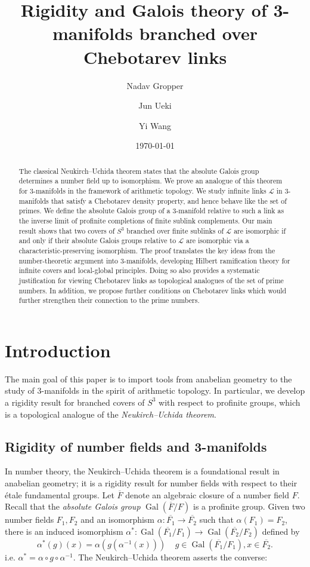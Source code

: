 \documentclass{amsart}
\title{Rigidity and Galois theory of 3-manifolds branched over Chebotarev links}
\author{Nadav Gropper}
\author{Jun Ueki}
\author{Yi Wang}
\date{\today}
\theoremstyle{plain}
\theoremstyle{definition}
\theoremstyle{plain}
\theoremstyle{plain}
\theoremstyle{plain}
\theoremstyle{remark}
\theoremstyle{remark}
\theoremstyle{plain}
\theoremstyle{definition}
\theoremstyle{plain}
\DeclareMathOperator{\Gal}{\mathrm{Gal}}
\newcounter{main}
\theoremstyle{plain}
\theoremstyle{plain}
\numberwithin{equation}{section}
\begin{document}
\begin{abstract}
The classical Neukirch--Uchida theorem states that the absolute Galois group determines a number field up to isomorphism. We prove an analogue of this theorem for 3-manifolds in the framework of arithmetic topology. We study infinite links $\mathcal{L}$ in 3-manifolds that satisfy a Chebotarev density property, and hence behave like the set of primes. We define the absolute Galois group of a 3-manifold relative to such a link as the inverse limit of profinite completions of finite sublink complements. Our main result shows that two covers of $S^3$ branched over finite sublinks of $\mathcal{L}$ are isomorphic if and only if their absolute Galois groups relative to $\mathcal{L}$ are isomorphic via a characteristic-preserving isomorphism. The proof translates the key ideas from the number-theoretic argument into 3-manifolds, developing Hilbert ramification theory for infinite covers and local-global principles. Doing so also provides a systematic justification for viewing Chebotarev links as topological analogues of the set of prime numbers. In addition, we propose further conditions on Chebotarev links which would further strengthen their connection to the prime numbers. 
\end{abstract} 

\maketitle

\tableofcontents
\newpage
\section{Introduction}

The main goal of this paper is to import tools from anabelian geometry to the study of 3-manifolds in the spirit of arithmetic topology. In particular, we develop  a rigidity result for branched covers of $S^3$ with respect to profinite groups, which is a topological analogue of the \emph{Neukirch--Uchida theorem}.  

\subsection{Rigidity of number fields and 3-manifolds}

In number theory, the Neukirch--Uchida theorem is a foundational result in anabelian geometry; it is a rigidity result for number fields with respect to their \'etale fundamental groups. Let $\overline{F}$ denote an algebraic closure of a number field $F$. 
Recall that the \emph{absolute Galois group} $\Gal(\overline{F}/F)$ is a profinite group. Given two number fields $F_1, F_2$ and an isomorphism $\alpha: \overline{F_1} \to \overline{F_2}$ such that $\alpha(F_1) = F_2$, there is an induced isomorphism $\alpha^\ast:\Gal(\overline{F_1}/F_1) \to \Gal(\overline{F_2}/F_2)$ defined by
\begin{equation}\label{eq:induced}
    \alpha^*(g)(x) = \alpha(g(\alpha^{-1}(x))) \ \ \ \ \ g \in \Gal(\overline{F_1}/F_1), x \in \overline{F_2}.
\end{equation}
i.e. $\alpha^* = \alpha \circ g \circ \alpha^{-1}$. The Neukirch--Uchida theorem asserts the converse:
\end{document}
